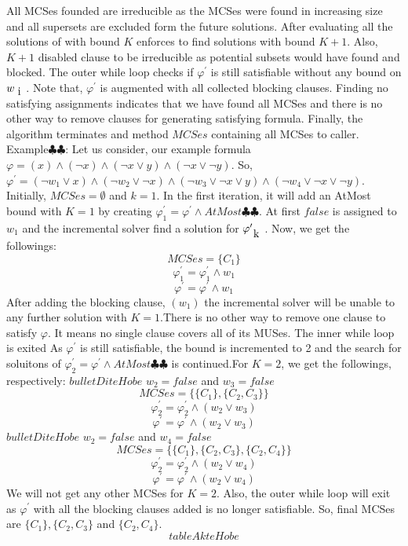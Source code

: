 All MCSes founded are irreducible as the MCSes were found in increasing size and all supersets are excluded form the future solutions. After evaluating all the solutions of with bound $K$ enforces to find solutions with bound $K+1$. Also, $K+1$ disabled clause to be irreducible as potential subsets would have found and blocked.\newline
The outer while loop checks if $\varphi^{\prime}$ is still satisfiable without any bound on $w_{\text i}$. Note that, $\varphi^{\prime}$ is augmented with all  collected blocking clauses. Finding no satisfying assignments indicates that we have found all MCSes and there is no other way to remove clauses for generating satisfying formula. Finally, the algorithm terminates and method $MCSes$ containing all MCSes to caller.\newline
Example$\clubsuit\clubsuit$:\newline
Let us consider, our example formula $\varphi=(x)\wedge(\neg x)\wedge(\neg x\vee y)\wedge(\neg x \vee \neg y)$. So, $\varphi^{\prime}=(\neg w_{1}\vee x)\wedge(\neg w_{2}\vee \neg x)\wedge(\neg w_{3}\vee \neg x\vee y)\wedge(\neg w_{4}\vee \neg x \vee \neg y)$. Initially, $MCSes=\emptyset$ and $k=1$.\newline
In the first iteration, it will add an AtMost bound with $K=1$ by creating $\varphi^{\prime}_{1}=\varphi^{\prime} \wedge AtMost\clubsuit\clubsuit$. At first $false$ is assigned to $w_{1}$ and the incremental solver find a solution for $\varphi^{\prime}_{\text k}$. Now, we get the followings:
$$MCSes=\{C_{1}\}$$
$$\varphi^{\prime}_{1}=\varphi^{\prime}_{1} \wedge w_{1}$$
$$\varphi^{\prime}=\varphi^{\prime} \wedge w_{1}$$
After adding the blocking clause, $(w_{1})$ the incremental solver will be unable to any further solution with $K=1$.There is no other way to remove one clause to satisfy $\varphi$. It means no single clause covers all of its MUSes. The inner while loop is exited\newline
As $\varphi^{\prime}$ is still satisfiable, the bound is incremented to 2 and the search for soluitons of $\varphi^{\prime}_{2}=\varphi^{\prime} \wedge AtMost\clubsuit\clubsuit$ is continued.For $K=2$, we get the followings, respectively:
$bulletDiteHobe$ $w_{2}=false$ and $w_{3}=false$
$$MCSes=\{\{C_{1}\}, \{C_{2}, C_{3}\}\}$$
$$\varphi^{\prime}_{2}=\varphi^{\prime}_{2} \wedge (w_{2}\vee w_{3})$$
$$\varphi^{\prime}=\varphi^{\prime} \wedge (w_{2}\vee w_{3})$$
$bulletDiteHobe$ $w_{2}=false$ and $w_{4}=false$
$$MCSes=\{\{C_{1}\}, \{C_{2}, C_{3}\}, \{C_{2}, C_{4}\}\}$$
$$\varphi^{\prime}_{2}=\varphi^{\prime}_{2} \wedge (w_{2}\vee w_{4})$$
$$\varphi^{\prime}=\varphi^{\prime} \wedge (w_{2}\vee w_{4})$$
We will not get any other MCSes for $K=2$. Also, the outer while loop will exit as $\varphi^{\prime}$ with all the blocking clauses added is no longer satisfiable. So, final MCSes are $\{C_{1}\}, \{C_{2}, C_{3}\}$ and $\{C_{2}, C_{4}\}$.
$$tableAkteHobe$$
